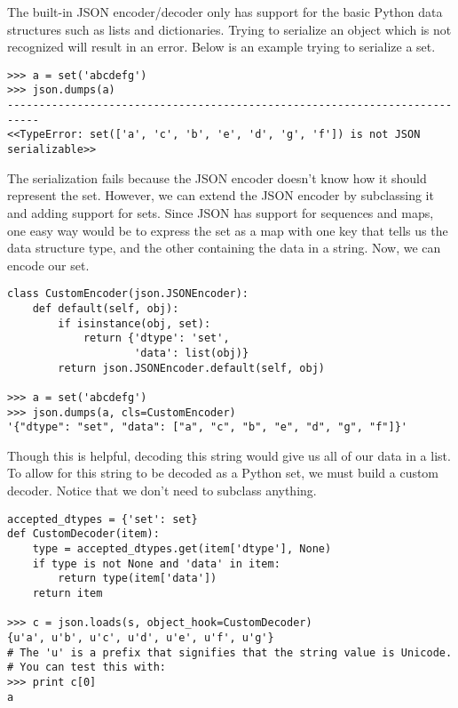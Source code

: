 The built-in JSON encoder/decoder only has support for the basic Python data structures such as lists and dictionaries.
Trying to serialize an object which is not recognized will result in an error. Below is an example trying to serialize a set.
\begin{lstlisting}
>>> a = set('abcdefg')
>>> json.dumps(a)
---------------------------------------------------------------------------
<<TypeError: set(['a', 'c', 'b', 'e', 'd', 'g', 'f']) is not JSON serializable>>
\end{lstlisting}
The serialization fails because the JSON encoder doesn't know how it should represent the set.
However, we can extend the JSON encoder by subclassing it and adding support for sets.
Since JSON has support for sequences and maps, one easy way would be to express the set as a map with one key that tells us the data structure type, and the other containing the data in a string.
Now, we can encode our set.
\begin{lstlisting}
class CustomEncoder(json.JSONEncoder):
    def default(self, obj):
        if isinstance(obj, set):
            return {'dtype': 'set',
                    'data': list(obj)}
        return json.JSONEncoder.default(self, obj)
        
>>> a = set('abcdefg')   
>>> json.dumps(a, cls=CustomEncoder)
'{"dtype": "set", "data": ["a", "c", "b", "e", "d", "g", "f"]}'
\end{lstlisting}
Though this is helpful, decoding this string would give us all of our data in a list.
To allow for this string to be decoded as a Python set, we must build a custom decoder.
Notice that we don't need to subclass anything.
\begin{lstlisting}
accepted_dtypes = {'set': set}
def CustomDecoder(item):
    type = accepted_dtypes.get(item['dtype'], None)
    if type is not None and 'data' in item:
        return type(item['data'])
    return item

>>> c = json.loads(s, object_hook=CustomDecoder)
{u'a', u'b', u'c', u'd', u'e', u'f', u'g'}
# The 'u' is a prefix that signifies that the string value is Unicode.
# You can test this with:
>>> print c[0]
a
\end{lstlisting}


